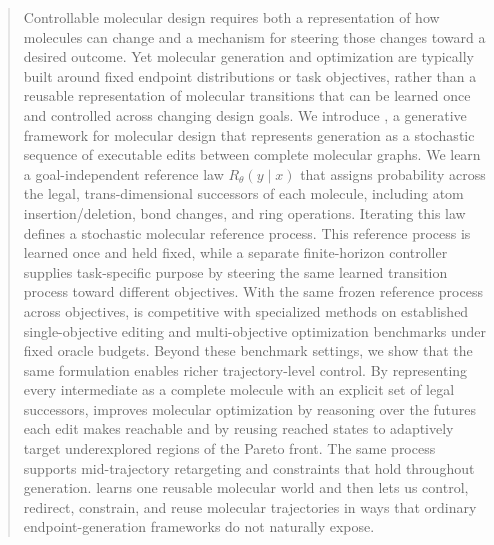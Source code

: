 \begin{abstract}
Controllable molecular design requires both a representation of how molecules can change and a mechanism for steering those changes toward a desired outcome. Yet molecular generation and optimization are typically built around fixed endpoint distributions or task objectives, rather than a reusable representation of molecular transitions that can be learned once and controlled across changing design goals. We introduce \method, a generative framework for molecular design that represents generation as a stochastic sequence of executable edits between complete molecular graphs. We learn a goal-independent reference law $R_\theta(y\mid x)$ that assigns probability across the legal, trans-dimensional successors of each molecule, including atom insertion/deletion, bond changes, and ring operations. Iterating this law defines a stochastic molecular reference process. This reference process is learned once and held fixed, while a separate finite-horizon controller supplies task-specific purpose by steering the same learned transition process toward different objectives. With the same frozen reference process across objectives, \method{} is competitive with specialized methods on established single-objective editing and multi-objective optimization benchmarks under fixed oracle budgets. Beyond these benchmark settings, we show that the same formulation enables richer trajectory-level control. By representing every intermediate as a complete molecule with an explicit set of legal successors, \method{} improves molecular optimization by reasoning over the futures each edit makes reachable and by reusing reached states to adaptively target underexplored regions of the Pareto front. The same process supports mid-trajectory retargeting and constraints that hold throughout generation. \method{} learns one reusable molecular world and then lets us control, redirect, constrain, and reuse molecular trajectories in ways that ordinary endpoint-generation frameworks do not naturally expose.
\end{abstract}
